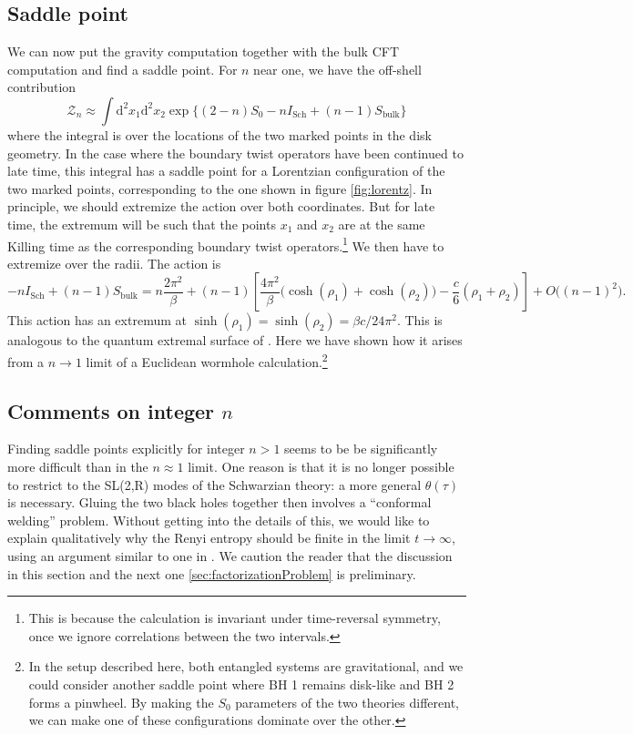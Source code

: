 \documentclass[12pt]{article}
\newcommand{\be}{\begin{equation}}
\newcommand{\ee}{\end{equation}}
\numberwithin{equation}{section}
\begin{document}
\subsection{Saddle point}
We can now put the gravity computation together with the bulk CFT computation and find a saddle point. For $n$ near one, we have the off-shell contribution 
\be
\mathcal{Z}_n \approx \int \mathrm{d}^2x_1\mathrm{d}^2x_2 \exp\Big\{ (2-n)S_0 - n I_{\text{Sch}} + (n-1)S_{\text{bulk}}\Big\}
\ee
where the integral is over the locations of the two marked points in the disk geometry. In the case where the boundary twist operators have been continued to late time, this integral has a saddle point for a Lorentzian configuration of the two marked points, corresponding to the one shown in figure \ref{fig:lorentz}. In principle, we should extremize the action over both coordinates. But for late time, the extremum will be such that the points $x_1$ and $x_2$ are at the same Killing time as the corresponding boundary twist operators.\footnote{This is because the calculation is invariant under time-reversal symmetry, once we ignore correlations between the two intervals.} We then have to extremize over the radii. The action is
\be
-nI_{\text{Sch}} + (n-1)S_{\text{bulk}} = n\frac{2\pi^2}{\beta} + (n-1)\left[\frac{4\pi^2}{\beta}\big(\cosh(\rho_1) + \cosh(\rho_2)\big) - \frac{c}{6}(\rho_1+\rho_2)\right] + O\big((n-1)^2\big).
\ee
This action has an extremum at $\sinh(\rho_1) = \sinh(\rho_2) =  \beta c/24\pi^2$. This is analogous to the quantum extremal surface of \cite{Penington:2019npb,Almheiri:2019psf,Almheiri:2019hni,Almheiri:2019yqk}. Here we have shown how it arises from a $n\to 1$ limit of a Euclidean wormhole calculation.\footnote{In the setup described here, both entangled systems are gravitational, and we could consider another saddle point where BH 1 remains disk-like and BH 2 forms a pinwheel. By making the $S_0$ parameters of the two theories different, we can make one of these configurations dominate over the other.}


\subsection{Comments on integer \texorpdfstring{$n$}{n}}\label{sec:commentsoninteger n}
Finding saddle points explicitly for integer $n > 1$ seems to be be significantly more difficult than in the $n\approx 1$ limit. One reason is that it is no longer possible to restrict to the SL(2,R) modes of the Schwarzian theory: a more general $\theta(\tau)$ is necessary. Gluing the two black holes together then involves a ``conformal welding'' problem. Without getting into the details of this, we would like to explain qualitatively why the Renyi entropy should be finite in the limit $t\rightarrow \infty$, using an argument similar to one in \cite{Saad:2018bqo}. We caution the reader that the discussion in this section and the next one \ref{sec:factorizationProblem} is preliminary.
\end{document}
